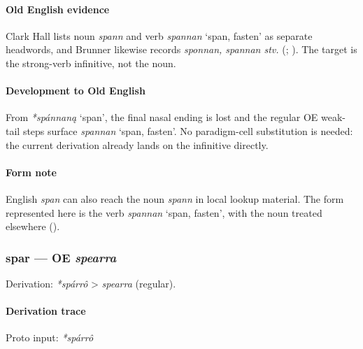 \documentclass[
  british,
  a4paper,
]{article}
\providecommand{\Recon}[1]{\emph{*#1}}
\begin{document}
\paragraph{Old English evidence}\label{old-english-evidence-52}

Clark Hall lists noun \emph{spann} and verb {\emph{spannan}} `span,
fasten' as separate headwords, and Brunner likewise records
\emph{sponnan, spannan stv.} (; ). The target is
the strong-verb infinitive, not the noun.

\paragraph{Development to Old
English}\label{development-to-old-english-52}

From \Recon{spánnaną} `span', the final nasal ending is lost and the
regular OE weak-tail steps surface {\emph{spannan}} `span, fasten'. No
paradigm-cell substitution is needed: the current derivation already
lands on the infinitive directly.

\paragraph{Form note}\label{form-note-18}

English \emph{span} can also reach the noun \emph{spann} in local lookup
material. The form represented here is the verb {\emph{spannan}} `span,
fasten', with the noun treated elsewhere
().

\subsubsection{\texorpdfstring{spar --- OE
\emph{spearra}}{spar --- OE spearra}}\label{spar-oe-spearra}

Derivation: \emph{*spárrô} \textgreater{} \emph{spearra} (regular).

\paragraph{Derivation trace}\label{derivation-trace-57}

Proto input: \emph{*spárrô}

\begingroup
\setlength{\fboxsep}{6pt}
\end{document}
